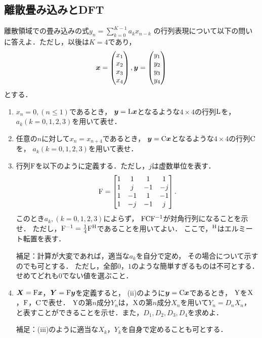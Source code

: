 \subsection{離散畳み込みとDFT}
  離散領域での畳み込みの式$y_n=\sum^{K-1}_{k=0}a_kx_{n-k}$
  の行列表現について以下の問いに答えよ．ただし，以後は$K=4$であり，
  \begin{equation}
    \boldsymbol{x} = \begin{pmatrix}x_1\\x_2\\x_3\\x_4\end{pmatrix},
    \boldsymbol{y} = \begin{pmatrix}y_1\\y_2\\y_3\\y_4\end{pmatrix}
  \end{equation}
  とする．
  \begin{enumerate}[label=(\roman*)]
    \item $x_n=0,(n \le 1)$であるとき，
      $\boldsymbol{y}=\mathrm{L}\boldsymbol{x}$となるような$4\times4$の行列$\mathrm{L}$を，$a_k (k=0,1,2,3)$を用いて表せ．
    \item 任意の$n$に対して$x_n=x_{n+4}$であるとき，
      $\boldsymbol{y}=\mathrm{C}\boldsymbol{x}$となるような$4\times4$の行列$\mathrm{C}$を，
      $a_k (k=0,1,2,3)$を用いて表せ．
    \item 行列$\mathrm{F}$を以下のように定義する．ただし，$j$は虚数単位を表す．
      \begin{equation}
        \mathrm{F} =
          \begin{bmatrix}
            1 &  1 &  1&  1\\
            1 &  j & -1& -j\\
            1 & -1 &  1& -1\\
            1 & -j & -1&  j
          \end{bmatrix}.
      \end{equation}
      このとき$a_k,(k=0,1,2,3)$によらず，
      $\mathrm{F}\mathrm{C}\mathrm{F}^{-1}$が対角行列になることを示せ．
      ただし，$\mathrm{F}^{-1}=\frac{1}{4}\mathrm{F}^\mathrm{H}$であることを用いてよい．
      ここで，$^\mathrm{H}$はエルミート転置を表す．

      補足：計算が大変であれば，適当な$a_k$を自分で定め，
      その場合について示すのでも可とする．
      ただし，全部$0$，$1$のような簡単すぎるものは不可とする．
      せめてどれも$0$でない値を選ぶこと．
    \item $\boldsymbol{X}=\mathrm{F}\boldsymbol{x}$，$\boldsymbol{Y}=\mathrm{F}\boldsymbol{y}$を定義すると，
      (ii)のように$\boldsymbol{y}=\mathrm{C}\boldsymbol{x}$であるとき，
      $\mathrm{Y}$を$\mathrm{X}$，$\mathrm{F}$，$\mathrm{C}$で表せ．
      $\mathrm{Y}$の第$n$成分$Y_n$は，$\mathrm{X}$の第$n$成分$X_n$を用いて$Y_n=D_nX_n$，
      と表すことができることを示せ．また，$D_1,D_2,D_3,D_4$を求めよ．

      補足：(iii)のように適当な$X_k$，$Y_k$を自身で定めることも可とする．
    \end{enumerate}

